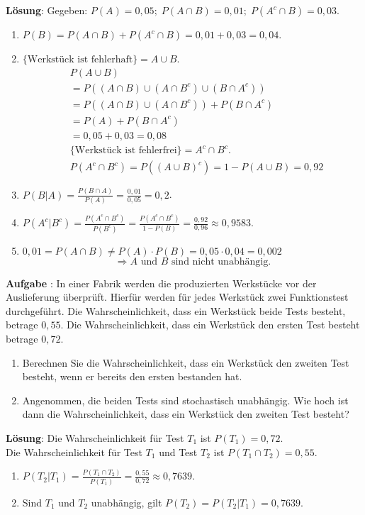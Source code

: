 \documentclass[a4paper,13pt]{scrartcl}
\newcommand{\exercise}{\vspace*{0.2cm}
\stepcounter{aufgabe}
\noindent
\textbf{Aufgabe \arabic{aufgabe}}: }
\newcounter{aufgabe}
\newcommand{\solution}{\vspace*{0.2cm}
\noindent
\textbf{Lösung}: }
\begin{document}
\solution
Gegeben: $P(A) = 0,05; \; P(A \cap B) = 0,01; \; P(A^c \cap B) = 0,03$.
\begin{enumerate}[label=(\alph*)]
\item $P(B) = P(A \cap B) + P(A^c \cap B) = 0,01 + 0,03 = 0,04$.
\item $ \{ \text{Werkstück ist fehlerhaft} \} = A \cup B$.
\begin{align*}
    & P(A \cup B) \\
    & = P((A \cap B) \cup (A \cap B^c) \cup (B \cap A^c))\\
    & = P((A \cap B) \cup (A \cap B^c)) + P(B \cap A^c)\\
    & = P(A) + P(B \cap A^c) \\
    & = 0,05 + 0,03 = 0,08\\
    & \{ \text{Werkstück ist fehlerfrei} \} = A^c \cap B^c.\\
    & P(A^c \cap B^c) = P((A \cup B)^c) = 1 - P(A \cup B)= 0,92
\end{align*}
\item $P(B | A) = \frac{P(B \cap A)}{P(A)} = \frac{0,01}{0,05} = 0,2$.
\item $P(A^c | B^c) = \frac{P(A^c \cap B^c)}{P(B^c)} = \frac{P(A^c \cap B^c)}{1 - P(B)} = \frac{0,92}{0,96} \approx 0,9583$.
\item $0,01 = P(A \cap B) \neq P(A) \cdot P(B) = 0,05 \cdot 0,04 = 0,002$ $$ \Rightarrow A \text{ und } B \text{ sind nicht unabhängig.}$$
\end{enumerate}
\vspace{8mm}

\newpage
\exercise
In einer Fabrik werden die produzierten Werkstücke vor der Auslieferung überprüft. Hierfür werden für jedes Werkstück   zwei Funktionstest durchgeführt.  Die Wahrscheinlichkeit, dass ein Werkstück beide Tests besteht, betrage $0,55$. Die Wahrscheinlichkeit, dass ein Werkstück  den ersten Test besteht betrage $0,72$. 
\begin{enumerate}[label=(\alph*)]
\item Berechnen Sie die Wahrscheinlichkeit, dass ein Werkstück den zweiten Test besteht, wenn er bereits den ersten bestanden hat.
\item Angenommen, die beiden Tests sind stochastisch unabhängig. Wie hoch ist dann die Wahrscheinlichkeit, dass ein Werkstück den zweiten Test besteht?
\end{enumerate}
\vspace{4mm}

\solution
Die Wahrscheinlichkeit für  Test $T_1$  ist $P(T_1) = 0,72$.\\
Die Wahrscheinlichkeit für  Test $T_1$ und Test $T_2$ ist $P(T_1 \cap T_2) = 0,55$.
\begin{enumerate}[label=(\alph*)]
\item $P(T_2 | T_1) = \frac{P(T_1 \cap T_2)}{P(T_1)} = \frac{0,55} {0,72} \approx 0,7639$.
\item Sind $T_1$ und $T_2$ unabhängig, gilt  $P(T_2) = P(T_2 | T_1) = 0,7639$.
\end{enumerate}
\vspace{8mm}
\end{document}
